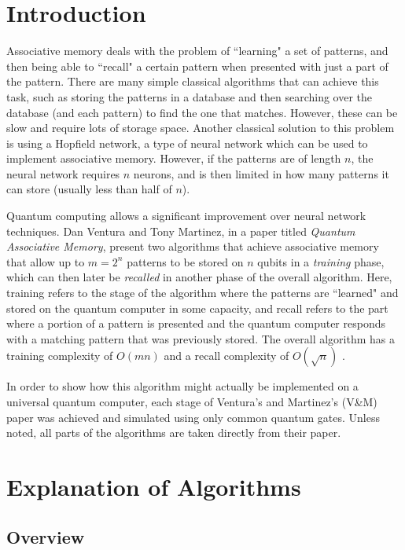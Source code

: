 \documentclass[11pt]{report}
\newcommand{\?}{\stackrel{?}{=}}
\begin{document}
\section{Introduction}

Associative memory deals with the problem of ``learning" a set of patterns, and then being able to ``recall" a certain pattern when presented with just a part of the pattern. There are many simple classical algorithms that can achieve this task, such as storing the patterns in a database and then searching over the database (and each pattern) to find the one that matches. However, these can be slow and require lots of storage space. Another classical solution to this problem is using a Hopfield network, a type of neural network which can be used to implement associative memory. However, if the patterns are of length $n$, the neural network requires $n$ neurons, and is then limited in how many patterns it can store (usually less than half of $n$).

Quantum computing allows a significant improvement over neural network techniques. Dan Ventura and Tony Martinez, in a paper titled \textit{Quantum Associative Memory}, present two algorithms that achieve associative memory that allow up to $m=2^n$ patterns to be stored on $n$ qubits in a \textit{training} phase, which can then later be \textit{recalled} in another phase of the overall algorithm. Here, training refers to the stage of the algorithm where the patterns are ``learned" and stored on the quantum computer in some capacity, and recall refers to the part where a portion of a pattern is presented and the quantum computer responds with a matching pattern that was previously stored. The overall algorithm has a training complexity of $O(mn)$ and a recall complexity of $O(\sqrt{n})$ \cite{Ven00}. 

In order to show how this algorithm might actually be implemented on a universal quantum computer, each stage of Ventura's and Martinez's (V\&M) paper was achieved and simulated using only common quantum gates. Unless noted, all parts of the algorithms are taken directly from their paper.

\section{Explanation of Algorithms}

\subsection{Overview}
\end{document}
